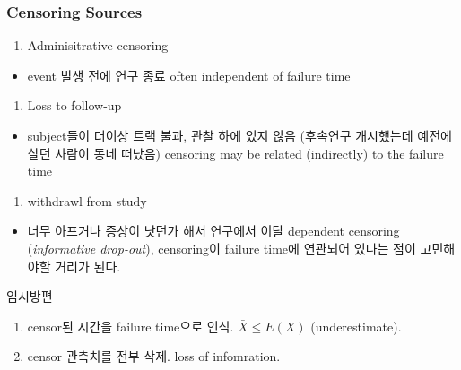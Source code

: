 \documentclass[
]{book}
\providecommand{\tightlist}{%
  \setlength{\itemsep}{0pt}\setlength{\parskip}{0pt}}
\begin{document}
{{{\hypertarget{censoring-sources}{%
\subsubsection{Censoring Sources}\label{censoring-sources}}

\begin{enumerate}
\def\labelenumi{\arabic{enumi}.}
\tightlist
\item
  Adminisitrative censoring
\end{enumerate}

\begin{itemize}
\tightlist
\item
  event 발생 전에 연구 종료
  often independent of failure time
\end{itemize}

\begin{enumerate}
\def\labelenumi{\arabic{enumi}.}
\setcounter{enumi}{1}
\tightlist
\item
  Loss to follow-up
\end{enumerate}

\begin{itemize}
\tightlist
\item
  subject들이 더이상 트랙 불과, 관찰 하에 있지 않음 (후속연구 개시했는데 예전에 살던 사람이 동네 떠났음)
  censoring may be related (indirectly) to the failure time
\end{itemize}

\begin{enumerate}
\def\labelenumi{\arabic{enumi}.}
\setcounter{enumi}{2}
\tightlist
\item
  withdrawl from study
\end{enumerate}

\begin{itemize}
\tightlist
\item
  너무 아프거나 증상이 낫던가 해서 연구에서 이탈
  dependent censoring (\emph{informative drop-out}), censoring이 failure time에 연관되어 있다는 점이 고민해야할 거리가 된다.
\end{itemize}

임시방편

\begin{enumerate}
\def\labelenumi{\arabic{enumi}.}
\item
  censor된 시간을 failure time으로 인식. \(\bar X \le E(X)\) (underestimate).
\item
  censor 관측치를 전부 삭제. loss of infomration.
\end{enumerate}

}}}
\end{document}
